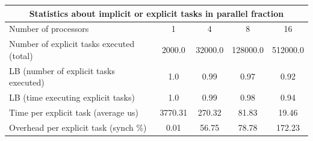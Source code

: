 \begin{tabular}{|l|c|c|c|c|}
\hline
\multicolumn{5}{|c|}{Statistics about implicit or explicit tasks in parallel fraction} \\
\hline
\hline
Number of processors & 1 & 4 & 8 & 16 \\
\hline
\hline
Number of explicit tasks executed (total)        &          2000.0 &         32000.0 &        128000.0 &        512000.0 \\
\hline
LB (number of explicit tasks executed)           &             1.0 &            0.99 &            0.97 &            0.92 \\
\hline
LB (time executing explicit tasks)               &             1.0 &            0.99 &            0.98 &            0.94 \\
\hline
Time per explicit task (average us)                 &         3770.31 &          270.32 &           81.83 &           19.46 \\
\hline
Overhead per explicit task (synch \%)             &            0.01 &           56.75 &           78.78 &          172.23 \\
\hline
\end{tabular}
